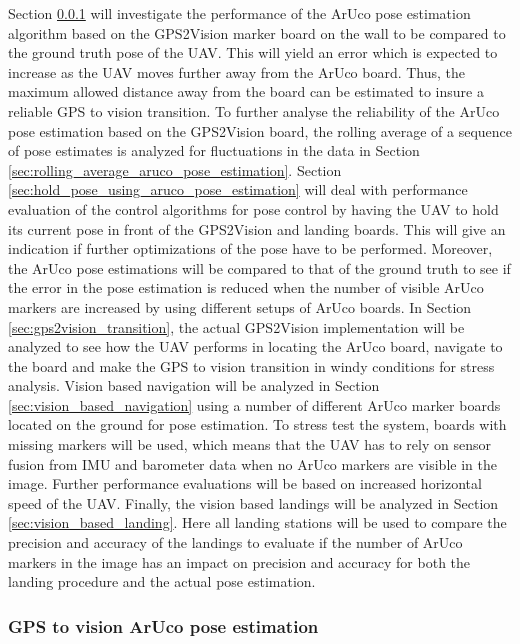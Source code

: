\documentclass[../Head/report.tex]{subfiles}
\begin{document}
Section \ref{sec:GPS2Vision_pose_estimation} will investigate the performance of the ArUco pose estimation algorithm based on the GPS2Vision marker board on the wall to be compared to the ground truth pose of the UAV. This will yield an error which is expected to increase as the UAV moves further away from the ArUco board. Thus, the maximum allowed distance away from the board can be estimated to insure a reliable GPS to vision transition. To further analyse the reliability of the ArUco pose estimation based on the GPS2Vision board, the rolling average of a sequence of pose estimates is analyzed for fluctuations in the data in Section \ref{sec:rolling_average_aruco_pose_estimation}. Section \ref{sec:hold_pose_using_aruco_pose_estimation} will deal with performance evaluation of the control algorithms for pose control by having the UAV to hold its current pose in front of the GPS2Vision and landing boards. This will give an indication if further optimizations of the pose have to be performed. Moreover, the ArUco pose estimations will be compared to that of the ground truth to see if the error in the pose estimation is reduced when the number of visible ArUco markers are increased by using different setups of ArUco boards. In Section \ref{sec:gps2vision_transition}, the actual GPS2Vision implementation will be analyzed to see how the UAV performs in locating the ArUco board, navigate to the board and make the GPS to vision transition in windy conditions for stress analysis. Vision based navigation will be analyzed in Section \ref{sec:vision_based_navigation} using a number of different ArUco marker boards located on the ground for pose estimation. To stress test the system, boards with missing markers will be used, which means that the UAV has to rely on sensor fusion from IMU and barometer data when no ArUco markers are visible in the image. Further performance evaluations will be based on increased horizontal speed of the UAV. Finally, the vision based landings will be analyzed in Section \ref{sec:vision_based_landing}. Here all landing stations will be used to compare the precision and accuracy of the landings to evaluate if the number of ArUco markers in the image has an impact on precision and accuracy for both the landing procedure and the actual pose estimation.

\subsubsection{GPS to vision ArUco pose estimation}
\label{sec:GPS2Vision_pose_estimation}
\end{document}
